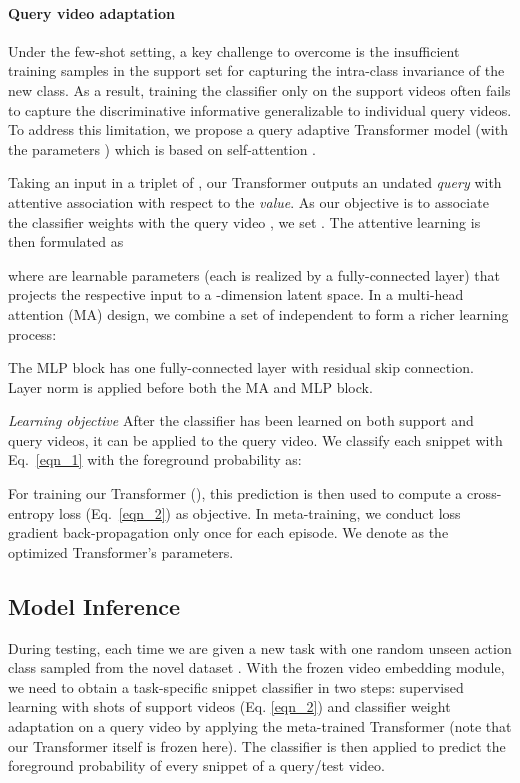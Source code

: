\documentclass{bmvc2k}
\begin{document}
\paragraph{Query video adaptation}
Under the few-shot setting, a key challenge to overcome is the insufficient training samples in the support set for  capturing the intra-class invariance of the new class. As a result, training the classifier only on the support videos often fails to capture the discriminative informative generalizable to individual query videos.
To address this limitation, we propose a query adaptive Transformer model (with the parameters ) 
which is based on self-attention  \cite{vaswani2017attention}.







Taking an input in a triplet of , our Transformer outputs an undated {\em query} with attentive association with respect to the {\em value}.
As our objective is to associate the classifier weights
 with the query video ,
we set .
The attentive learning is then formulated as

where  are learnable parameters (each is realized by a fully-connected layer) that projects 
the respective input to a -dimension latent space.
In a multi-head attention (MA) design, we combine a set of independent 
to form a richer learning process:

The MLP block has one fully-connected layer with residual skip connection. Layer norm is applied before both the MA and MLP block.




{\em Learning objective }
After the classifier has been learned on both support and query videos, it can be applied to the query video.
We classify each snippet with Eq.~\eqref{eqn_1} with the foreground probability as:

For training our Transformer (), this prediction is then used to compute a cross-entropy loss (Eq.~\eqref{eqn_2}) as objective.
In meta-training, we conduct loss gradient back-propagation only once for each episode.
We denote  as the optimized Transformer's parameters.
 















\subsection{Model Inference}
\label{sec:inference}
During testing, each time we are given a new task with one random unseen action class sampled from the novel dataset .
With the frozen video embedding module, we need to 
obtain a task-specific snippet classifier 
in two steps:
supervised learning with  shots of support videos (Eq. \eqref{eqn_2}) 
and 
classifier weight adaptation on a query video 
by applying the meta-trained Transformer 
(note that our Transformer itself is frozen here).
The classifier is then applied to predict the foreground probability
of every snippet of a query/test video.
\end{document}
